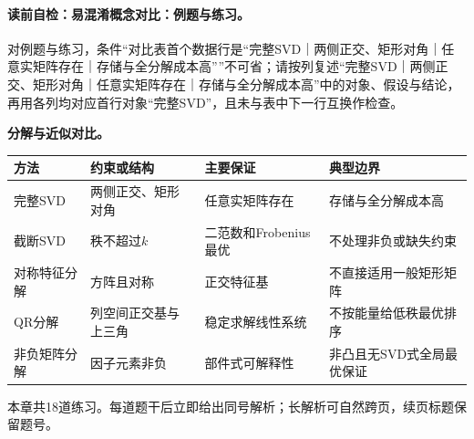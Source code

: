 \label{struct:V4-C03-CH31}
\paragraph{读前自检：易混淆概念对比：例题与练习。}对例题与练习，条件“对比表首个数据行是“完整SVD｜两侧正交、矩形对角｜任意实矩阵存在｜存储与全分解成本高””不可省；请按列复述“完整SVD｜两侧正交、矩形对角｜任意实矩阵存在｜存储与全分解成本高”中的对象、假设与结论，再用各列均对应首行对象“完整SVD”，且未与表中下一行互换作检查。\par

\begin{comparisonbox}
\textbf{分解与近似对比。}\par\smallskip
\begingroup
\footnotesize
\renewcommand{\arraystretch}{0.92}
\begin{tabularx}{\linewidth}{@{}l X X X@{}}
\toprule 方法 & 约束或结构 & 主要保证 & 典型边界\\ \midrule
完整SVD & 两侧正交、矩形对角 & 任意实矩阵存在 & 存储与全分解成本高\\
截断SVD & 秩不超过$k$ & 二范数和Frobenius最优 & 不处理非负或缺失约束\\
对称特征分解 & 方阵且对称 & 正交特征基 & 不直接适用一般矩形矩阵\\
QR分解 & 列空间正交基与上三角 & 稳定求解线性系统 & 不按能量给低秩最优排序\\
非负矩阵分解 & 因子元素非负 & 部件式可解释性 & 非凸且无SVD式全局最优保证\\
\bottomrule
\end{tabularx}
\endgroup
\end{comparisonbox}

\label{struct:V4-C03-CH34}
\begin{chapterexercisebox}
\label{struct:V4-C03-CH35}
本章共18道练习。每道题干后立即给出同号解析；长解析可自然跨页，续页标题保留题号。
\end{chapterexercisebox}

